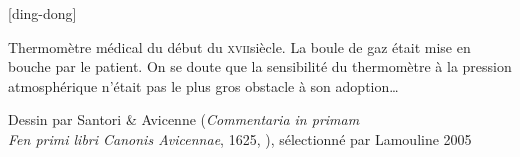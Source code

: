 {\begin{landscape}
\begin{minipage}[b]{0.45\linewidth}
\begin{center}
	\end{center}
	\captionsetup{singlelinecheck=off}
   [ding-dong]{Thermomètre médical du début du \textsc{xvii}\ieme siècle. La boule de gaz était mise en bouche par le patient. On se doute que la sensibilité du thermomètre à la pression atmosphérique n’était pas le plus gros obstacle à son adoption…\begin{credits}Dessin par Santori \& Avicenne (\textit{Commentaria in primam\\ Fen primi libri Canonis Avicennae}, 1625, \pd), sélectionné par Lamouline 2005~\cite{lamouline2005}\end{credits}}
	\label{fig_thermometre_medical}
\end{minipage}
\end{landscape}
}%

